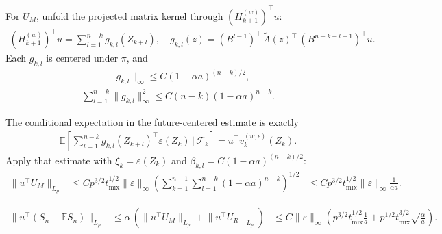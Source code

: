 For \(U_M\), unfold the projected matrix kernel through
\((H_{k+1}^{(w)})^\top u\):
\begin{equation}
\begin{aligned}
(H_{k+1}^{(w)})^\top u
  = \sum_{l=1}^{n-k} g_{k,l}(Z_{k+l}),
\quad
g_{k,l}(z)
  = (B^{l-1})^\top \, \widetilde{A}(z)^\top \, (B^{n-k-l+1})^\top u.
\end{aligned}
\end{equation}
Each \(g_{k,l}\) is centered under \(\pi\), and
\begin{equation}
\begin{aligned}
\lVert g_{k,l} \rVert_\infty
  \le C (1 - \alpha a)^{(n-k) / 2},
\end{aligned}
\end{equation}
\begin{equation}
\begin{aligned}
\sum_{l=1}^{n-k} \lVert g_{k,l} \rVert_\infty^2
  \le C (n-k)(1 - \alpha a)^{n-k}.
\end{aligned}
\end{equation}

The conditional expectation in the future-centered estimate is exactly
\begin{equation}
\begin{aligned}
\mathbb{E} \left[
  \sum_{l=1}^{n-k} g_{k,l}(Z_{k+l})^\top \varepsilon(Z_k)
  \, | \, \mathcal{F}_k
\right]
  = u^\top v_k^{(w, \epsilon)}(Z_k).
\end{aligned}
\end{equation}
Apply that estimate with
\(\xi_k = \varepsilon(Z_k)\) and
\(\beta_{k,l} = C (1 - \alpha a)^{(n-k) / 2}\):
\begin{equation}
\begin{aligned}
\lVert u^\top U_M \rVert_{L_p}
&\le C p^{3 / 2} t_{\text{mix}}^{1 / 2} \lVert \varepsilon \rVert_\infty
    \left(\sum_{k=1}^{n-1} \sum_{l=1}^{n-k}
      (1 - \alpha a)^{n-k}\right)^{1 / 2}
&\le C p^{3 / 2} t_{\text{mix}}^{1 / 2}
    \lVert \varepsilon \rVert_\infty \frac{1}{\alpha a}.
\end{aligned}
\end{equation}

\begin{equation}
\begin{aligned}
\lVert u^\top (S_n - \mathbb{E}S_n) \rVert_{L_p}
&\le \alpha \, (\lVert u^\top U_M \rVert_{L_p} + \lVert u^\top U_R \rVert_{L_p})
&\le C \lVert \varepsilon \rVert_\infty
  \left(p^{3 / 2} t_{\text{mix}}^{1 / 2} \frac{1}{a}
    + p^{1 / 2} t_{\text{mix}}^{3 / 2} \sqrt{\frac{\alpha}{a}}\right).
\end{aligned}
\end{equation}
